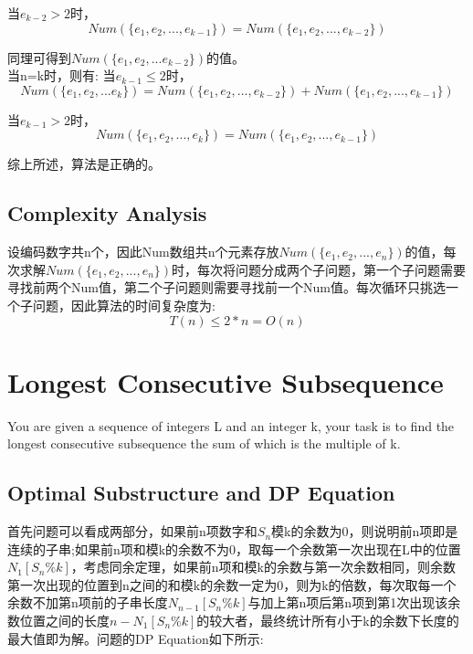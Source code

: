 \documentclass{article}
\begin{document}
当$e_{k-2} > 2$时，
\begin{equation}
Num(\{e_1,e_2,...,e_{k-1}\}) = Num(\{e_1,e_2,...,e_{k-2}\})
\end{equation}

同理可得到$Num(\{e_1,e_2,...e_{k-2}\})$的值。
\\

当n=k时，则有:
当$e_{k-1} \leq 2$时，
\begin{equation}
Num(\{e_1,e_2,...e_k\})=Num(\{e_1,e_2,...,e_{k-2}\}) + Num(\{e_1,e_2,...,e_{k-1}\})
\end{equation}

当$e_{k-1} > 2$时，
\begin{equation}
Num(\{e_1,e_2,...,e_k\}) = Num(\{e_1,e_2,...,e_{k-1}\})
\end{equation}

综上所述，算法是正确的。

\subsection{Complexity Analysis}

设编码数字共n个，因此Num数组共n个元素存放$Num(\{e_1,e_2,...,e_n\})$的值，每次求解$Num(\{e_1,e_2,...,e_n\})$时，每次将问题分成两个子问题，第一个子问题需要寻找前两个Num值，第二个子问题则需要寻找前一个Num值。每次循环只挑选一个子问题，因此算法的时间复杂度为:
\begin{equation}
T(n) \leq 2*n = O(n)
\end{equation}

\newpage
\section{Longest Consecutive Subsequence}
You are given a sequence of integers L and an integer k, your task is to find the longest consecutive subsequence the sum of which is the multiple of k.



\subsection{Optimal Substructure and DP Equation}

首先问题可以看成两部分，如果前n项数字和$S_n$模k的余数为0，则说明前n项即是连续的子串;如果前n项和模k的余数不为0，取每一个余数第一次出现在L中的位置$N_1[S_n\%k]$，考虑同余定理，如果前n项和模k的余数与第一次余数相同，则余数第一次出现的位置到n之间的和模k的余数一定为0，则为k的倍数，每次取每一个余数不加第n项前的子串长度$N_{n-1}[S_n\%k]$与加上第n项后第n项到第1次出现该余数位置之间的长度$n-N_1[S_n\%k]$的较大者，最终统计所有小于k的余数下长度的最大值即为解。问题的DP Equation如下所示:
\end{document}
